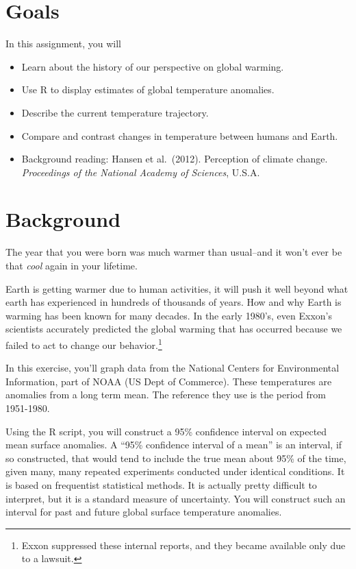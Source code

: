 \documentclass[
  letterpaper,
  DIV=11,
  numbers=noendperiod]{scrreprt}
\providecommand{\tightlist}{%
  \setlength{\itemsep}{0pt}\setlength{\parskip}{0pt}}
\begin{document}
\section{Goals}\label{goals-1}

In this assignment, you will

\begin{itemize}
\tightlist
\item
  Learn about the history of our perspective on global warming.
\item
  Use R to display estimates of global temperature anomalies.
\item
  Describe the current temperature trajectory.
\item
  Compare and contrast changes in temperature between humans and Earth.
\item
  Background reading: Hansen et al.~(2012). Perception of climate
  change. \emph{Proceedings of the National Academy of Sciences}, U.S.A.
\end{itemize}

\section{Background}\label{background-3}

The year that you were born was much warmer than usual--and it won't
ever be that \emph{cool} again in your lifetime.

Earth is getting warmer due to human activities, it will push it well
beyond what earth has experienced in hundreds of thousands of years. How
and why Earth is warming has been known for many decades. In the early
1980's, even Exxon's scientists accurately predicted the global warming
that has occurred because we failed to act to change our
behavior.\footnote{Exxon suppressed these internal reports, and they
  became available only due to a lawsuit.}

In this exercise, you'll graph data from the National Centers for
Environmental Information, part of NOAA (US Dept of Commerce). These
temperatures are anomalies from a long term mean. The reference they use
is the period from 1951-1980.

Using the R script, you will construct a 95\% confidence interval on
expected mean surface anomalies. A ``95\% confidence interval of a
mean'' is an interval, if so constructed, that would tend to include the
true mean about 95\% of the time, given many, many repeated experiments
conducted under identical conditions. It is based on frequentist
statistical methods. It is actually pretty difficult to interpret, but
it is a standard measure of uncertainty. You will construct such an
interval for past and future global surface temperature anomalies.
\end{document}
